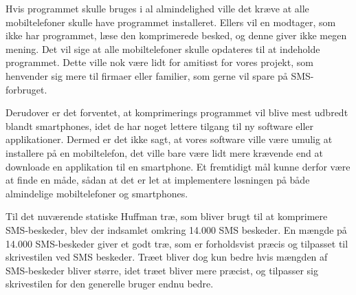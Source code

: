 Hvis programmet skulle bruges i al almindelighed ville det kræve at alle mobiltelefoner skulle have programmet installeret. Ellers vil en modtager, som ikke har programmet, læse den komprimerede besked, og denne giver ikke megen mening. Det vil sige at alle mobiltelefoner skulle opdateres til at indeholde programmet. Dette ville nok være lidt for amitiøst for vores projekt, som henvender sig mere til firmaer eller familier, som gerne vil spare på SMS-forbruget.
 
Derudover er det forventet, at komprimerings programmet vil  blive mest udbredt blandt smartphones, idet de har noget lettere tilgang til ny software eller applikationer. Dermed er det ikke sagt, at vores software ville være umulig at installere på en mobiltelefon, det ville bare være lidt mere krævende end at downloade en applikation til en smartphone. Et fremtidigt mål kunne derfor være at finde en måde, sådan at det er let at implementere løsningen på både almindelige mobiltelefoner og smartphones. 

Til det nuværende statiske Huffman træ, som bliver brugt til at komprimere SMS-beskeder, blev der indsamlet omkring 14.000 SMS beskeder. En mængde på 14.000 SMS-beskeder giver et godt træ, som er forholdsvist præcis og tilpasset til skrivestilen ved SMS beskeder. Træet bliver dog kun bedre hvis mængden af SMS-beskeder bliver større, idet træet bliver mere præcist, og tilpasser sig skrivestilen for den generelle bruger endnu bedre.
 
